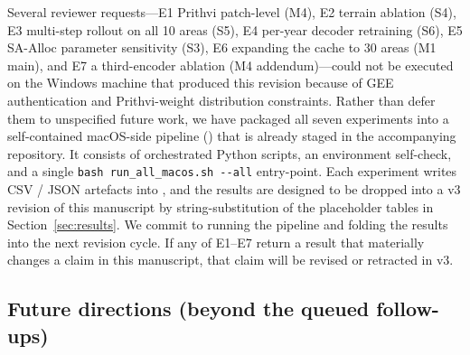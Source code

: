 \documentclass{article}
\begin{document}
Several reviewer requests---E1 Prithvi patch-level (M4), E2 terrain ablation (S4), E3 multi-step rollout on all 10 areas (S5), E4 per-year decoder retraining (S6), E5 SA-Alloc parameter sensitivity (S3), E6 expanding the cache to 30 areas (M1 main), and E7 a third-encoder ablation (M4 addendum)---could not be executed on the Windows machine that produced this revision because of GEE authentication and Prithvi-weight distribution constraints. Rather than defer them to unspecified future work, we have packaged all seven experiments into a self-contained macOS-side pipeline () that is already staged in the accompanying repository. It consists of orchestrated Python scripts, an environment self-check, and a single \verb|bash run_all_macos.sh --all| entry-point. Each experiment writes CSV / JSON artefacts into , and the results are designed to be dropped into a v3 revision of this manuscript by string-substitution of the placeholder tables in Section~\ref{sec:results}. We commit to running the pipeline and folding the results into the next revision cycle. If any of E1--E7 return a result that materially changes a claim in this manuscript, that claim will be revised or retracted in v3.

\subsection{Future directions (beyond the queued follow-ups)}
\label{sec:future}
\end{document}
